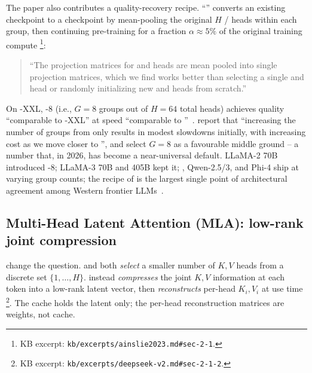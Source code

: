 The  paper also contributes a quality-recovery recipe.
``'' converts an existing  checkpoint to a 
checkpoint by mean-pooling the original $H$ / heads within
each group, then continuing pre-training for a fraction
$\alpha \approx 5\%$ of the original training compute%
\footnote{KB excerpt: \nolinkurl{kb/excerpts/ainslie2023.md#sec-2-1}.}:
\begin{quote}
``The projection matrices for  and  heads are mean pooled
into single projection matrices, which we find works better than
selecting a single  and  head or randomly initializing new
 and  heads from scratch.''~\citep[\S 2.1]{ainslie2023}
\end{quote}
On -XXL, -8 (i.e., $G = 8$ groups out of $H = 64$ total 
heads) achieves quality ``comparable to -XXL'' at speed
``comparable to ''~\citep[\S 3.2]{ainslie2023}. \citet[\S
3.3]{ainslie2023} report that ``increasing the number of groups
from  only results in modest slowdowns initially, with increasing
cost as we move closer to '', and select $G = 8$ as a favourable
middle ground -- a number that, in 2026, has become a near-universal
default. LLaMA-2 70B introduced -8; LLaMA-3 70B and 405B kept
it; , Qwen-2.5/3, and Phi-4 ship  at varying group counts;
the recipe of \citet{ainslie2023} is the largest single point of
architectural agreement among Western frontier
LLMs~\citep{touvron2023, jiang2023, meta-llama3, qwen3, phi4}.

\subsection{Multi-Head Latent Attention (MLA): low-rank joint compression}
\label{sec:attn-mla}

\citet{deepseek-v2} change the question.  and  both
\emph{select} a smaller number of $K, V$ heads from a discrete set
$\{1, \ldots, H\}$.  instead \emph{compresses} the joint $K, V$
information at each token into a low-rank latent vector, then
\emph{reconstructs} per-head $K_i, V_i$ at use time%
\footnote{KB excerpt: \nolinkurl{kb/excerpts/deepseek-v2.md#sec-2-1-2}.}.
The cache holds the latent only; the per-head reconstruction
matrices are weights, not cache.

